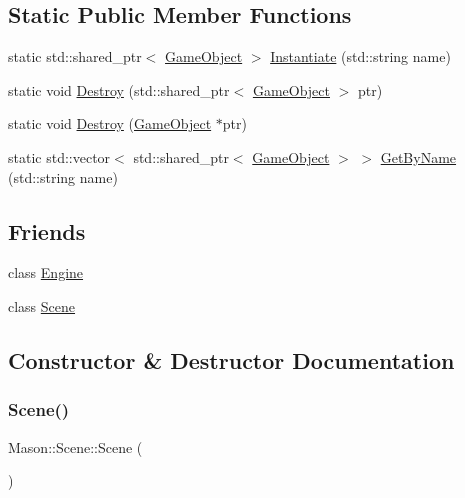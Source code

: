 \subsection*{Static Public Member Functions}
\begin{DoxyCompactItemize}
\item 
static std\+::shared\+\_\+ptr$<$ \hyperlink{class_mason_1_1_game_object}{Game\+Object} $>$ \hyperlink{class_mason_1_1_scene_a3eee172075ff2b845caffc8e641f9d9c}{Instantiate} (std\+::string name)
\item 
static void \hyperlink{class_mason_1_1_scene_a4721fcf8438883759478aee25bf247c2}{Destroy} (std\+::shared\+\_\+ptr$<$ \hyperlink{class_mason_1_1_game_object}{Game\+Object} $>$ ptr)
\item 
static void \hyperlink{class_mason_1_1_scene_a8f395f22c024c0d5161cfa8e024f177d}{Destroy} (\hyperlink{class_mason_1_1_game_object}{Game\+Object} $\ast$ptr)
\item 
static std\+::vector$<$ std\+::shared\+\_\+ptr$<$ \hyperlink{class_mason_1_1_game_object}{Game\+Object} $>$ $>$ \hyperlink{class_mason_1_1_scene_a684a224fe56794d0db86da99947a6fac}{Get\+By\+Name} (std\+::string name)
\end{DoxyCompactItemize}
\subsection*{Friends}
\begin{DoxyCompactItemize}
\item 
class \hyperlink{class_mason_1_1_scene_a3e1914489e4bed4f9f23cdeab34a43dc}{Engine}
\item 
class \hyperlink{class_mason_1_1_scene_a8060d758084fa30aaed3278425b90665}{Scene}
\end{DoxyCompactItemize}


\subsection{Constructor \& Destructor Documentation}
\hypertarget{class_mason_1_1_scene_a31b9509898769d98c7230ac78b95059d}{}\label{class_mason_1_1_scene_a31b9509898769d98c7230ac78b95059d} 
\subsubsection{\texorpdfstring{Scene()}{Scene()}}
{\footnotesize\ttfamily Mason\+::\+Scene\+::\+Scene (\begin{DoxyParamCaption}{ }\end{DoxyParamCaption})}




